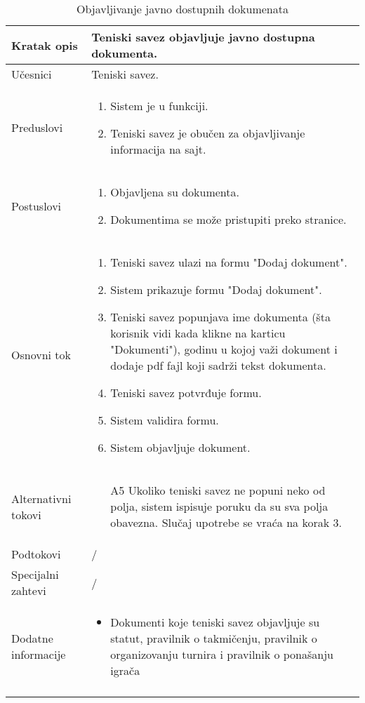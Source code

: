 \documentclass{article}
\begin{document}
    \begin{longtable}{| p{} | p{} |} 
        \hline
            Kratak opis & Teniski savez objavljuje javno dostupna dokumenta.\\ 
        \hline    
            U\v{c}esnici & Teniski savez.\\
        \hline
            Preduslovi & 
                \begin{enumerate}
                    \item Sistem je u funkciji.
                    \item Teniski savez je obu\v{c}en za objavljivanje informacija na sajt.
                \end{enumerate}\\
        \hline  
            Postuslovi & 
                \begin{enumerate}
                    \item Objavljena su dokumenta.
                    \item Dokumentima se mo\v{z}e pristupiti preko stranice.
                \end{enumerate}\\
        \hline
            Osnovni tok & 
                \begin{enumerate}
                    \item Teniski savez ulazi na formu "Dodaj dokument".
                    \item Sistem prikazuje formu "Dodaj dokument".
                    \item Teniski savez popunjava ime dokumenta (šta korisnik vidi kada klikne na karticu "Dokumenti"), godinu u kojoj važi dokument i dodaje pdf fajl koji sadrži tekst dokumenta.
                    \item Teniski savez potvrđuje formu.
                    \item Sistem validira formu.
                    \item Sistem objavljuje dokument.
                \end{enumerate}\\
        \hline
            Alternativni tokovi & 
                \begin{itemize}
                    \item[A5] Ukoliko teniski savez ne popuni neko od polja, sistem ispisuje poruku da su sva polja obavezna. Slučaj upotrebe se vraća na korak 3.
                \end{itemize}\\
        \hline
            Podtokovi & /\\
        \hline
            Specijalni zahtevi & /\\
        \hline
            Dodatne informacije & 
                \begin{itemize}
                    \item Dokumenti koje teniski savez objavljuje su statut, pravilnik o takmičenju, pravilnik o organizovanju turnira i pravilnik o ponašanju igrača
                \end{itemize}\\
        \hline    
        \caption{Objavljivanje javno dostupnih dokumenata}
    \end{longtable}
\end{document}
